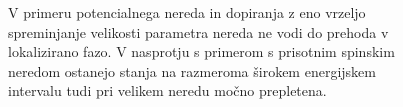  \begin{figure}[H]
\caption{V primeru potencialnega nereda in dopiranja z eno vrzeljo spreminjanje velikosti parametra nereda ne vodi do prehoda v lokalizirano fazo. V nasprotju s primerom s prisotnim spinskim neredom ostanejo stanja na razmeroma širokem energijskem intervalu tudi pri velikem neredu močno prepletena.}
\label{fig:H_ent_entro_density_11_5_1}
\end{figure} 



